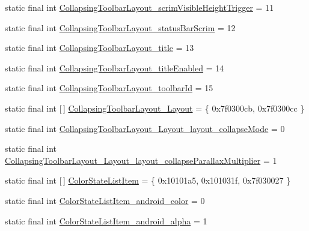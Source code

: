 \begin{DoxyCompactItemize}
static final int \mbox{\hyperlink{classandroid_1_1support_1_1design_1_1_r_1_1styleable_addcae54e0ba650d422a82a5ddbf35438}{Collapsing\+Toolbar\+Layout\+\_\+scrim\+Visible\+Height\+Trigger}} = 11
\item 
static final int \mbox{\hyperlink{classandroid_1_1support_1_1design_1_1_r_1_1styleable_a9a2f53e59e0ce9c6cf463013300a02a4}{Collapsing\+Toolbar\+Layout\+\_\+status\+Bar\+Scrim}} = 12
\item 
static final int \mbox{\hyperlink{classandroid_1_1support_1_1design_1_1_r_1_1styleable_ad1b550d16ea4dc77615ec73e00300c09}{Collapsing\+Toolbar\+Layout\+\_\+title}} = 13
\item 
static final int \mbox{\hyperlink{classandroid_1_1support_1_1design_1_1_r_1_1styleable_a653a3ffa637cabbce960a62a3ace1972}{Collapsing\+Toolbar\+Layout\+\_\+title\+Enabled}} = 14
\item 
static final int \mbox{\hyperlink{classandroid_1_1support_1_1design_1_1_r_1_1styleable_ad0d7a6184e81edf8ac6520145708bb74}{Collapsing\+Toolbar\+Layout\+\_\+toolbar\+Id}} = 15
\item 
static final int \mbox{[}$\,$\mbox{]} \mbox{\hyperlink{classandroid_1_1support_1_1design_1_1_r_1_1styleable_a21f871cca62a42d629c86010cc006092}{Collapsing\+Toolbar\+Layout\+\_\+\+Layout}} = \{ 0x7f0300cb, 0x7f0300cc \}
\item 
static final int \mbox{\hyperlink{classandroid_1_1support_1_1design_1_1_r_1_1styleable_ab2374822f464f783003bb86cda4a9753}{Collapsing\+Toolbar\+Layout\+\_\+\+Layout\+\_\+layout\+\_\+collapse\+Mode}} = 0
\item 
static final int \mbox{\hyperlink{classandroid_1_1support_1_1design_1_1_r_1_1styleable_afaeabc3cbad825e3dfd5601c97458acc}{Collapsing\+Toolbar\+Layout\+\_\+\+Layout\+\_\+layout\+\_\+collapse\+Parallax\+Multiplier}} = 1
\item 
static final int \mbox{[}$\,$\mbox{]} \mbox{\hyperlink{classandroid_1_1support_1_1design_1_1_r_1_1styleable_a06173f77bcf3bbc36e80eb4969fc61b7}{Color\+State\+List\+Item}} = \{ 0x10101a5, 0x101031f, 0x7f030027 \}
\item 
static final int \mbox{\hyperlink{classandroid_1_1support_1_1design_1_1_r_1_1styleable_a97c236b067e63c3c836b5d690cc14f6d}{Color\+State\+List\+Item\+\_\+android\+\_\+color}} = 0
\item 
static final int \mbox{\hyperlink{classandroid_1_1support_1_1design_1_1_r_1_1styleable_a5648cb9d7ec19125f394936186b01681}{Color\+State\+List\+Item\+\_\+android\+\_\+alpha}} = 1
\item 

\end{DoxyCompactItemize}
